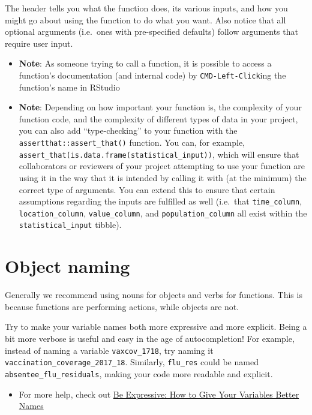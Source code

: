 \documentclass[
]{book}
\providecommand{\tightlist}{%
  \setlength{\itemsep}{0pt}\setlength{\parskip}{0pt}}
\begin{document}
The header tells you what the function does, its various inputs, and how you might go about using the function to do what you want. Also notice that all optional arguments (i.e.~ones with pre-specified defaults) follow arguments that require user input.

\begin{itemize}
\item
  \textbf{Note}: As someone trying to call a function, it is possible to access a function's documentation (and internal code) by \texttt{CMD-Left-Click}ing the function's name in RStudio
\item
  \textbf{Note}: Depending on how important your function is, the complexity of your function code, and the complexity of different types of data in your project, you can also add ``type-checking'' to your function with the \texttt{assertthat::assert\_that()} function. You can, for example, \texttt{assert\_that(is.data.frame(statistical\_input))}, which will ensure that collaborators or reviewers of your project attempting to use your function are using it in the way that it is intended by calling it with (at the minimum) the correct type of arguments. You can extend this to ensure that certain assumptions regarding the inputs are fulfilled as well (i.e.~that \texttt{time\_column}, \texttt{location\_column}, \texttt{value\_column}, and \texttt{population\_column} all exist within the \texttt{statistical\_input} tibble).
\end{itemize}

\section{Object naming}\label{object-naming}

Generally we recommend using nouns for objects and verbs for functions. This is because functions are performing actions, while objects are not.

Try to make your variable names both more expressive and more explicit. Being a bit more verbose is useful and easy in the age of autocompletion! For example, instead of naming a variable \texttt{vaxcov\_1718}, try naming it \texttt{vaccination\_coverage\_2017\_18}. Similarly, \texttt{flu\_res} could be named \texttt{absentee\_flu\_residuals}, making your code more readable and explicit.

\begin{itemize}
\tightlist
\item
  For more help, check out \href{https://spin.atomicobject.com/2017/11/01/good-variable-names/}{Be Expressive: How to Give Your Variables Better Names}
\end{itemize}
\end{document}
